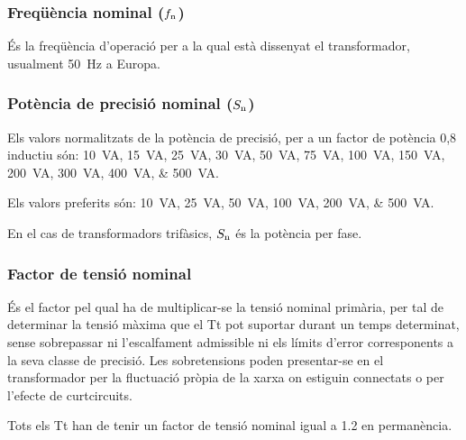\subsubsection{Freqüència nominal ($f_\mathrm{n}$)}

 És la freqüència d'operació per a la qual  està dissenyat el transformador, usualment \SI{50}{Hz} a Europa.

\subsubsection{Potència de precisió nominal ($S_\mathrm{n}$)}

Els valors normalitzats de la potència de precisió, per
a un factor de potència 0,8 inductiu són: \SIlist{10; 15; 25; 30; 50; 75; 100; 150;
 200; 300; 400; 500}{VA}.

 Els valors preferits són: \SIlist{10; 25; 50; 100; 200; 500}{VA}.

En el cas de transformadors trifàsics, $S_\mathrm{n}$ és la potència per fase.

\subsubsection{Factor de tensió nominal}

 És el factor pel qual ha de
multiplicar-se la tensió nominal primària, per tal de determinar la
tensió màxima que el Tt pot suportar durant un temps determinat,
sense sobrepassar ni l'escalfament admissible ni els límits d'error
corresponents a la seva classe de precisió. Les sobretensions poden
presentar-se en el transformador  per la fluctuació
pròpia de la xarxa on estiguin connectats o per l'efecte de curtcircuits.

Tots els  Tt han de tenir un factor de tensió nominal igual a \num{1,2} en permanència.

